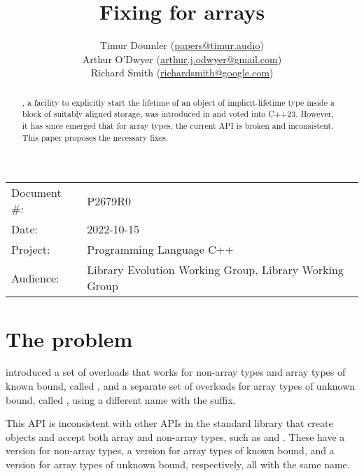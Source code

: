 

\newcommand{\forceindent}{\parindent=1em\indent\parindent=0pt\relax} %


\title{Fixing  for arrays}
\author{
  Timur Doumler \small(\href{mailto:papers@timur.audio}{papers@timur.audio}) \\
  Arthur O'Dwyer \small(\href{mailto:arthur.j.odwyer@gmail.com}{arthur.j.odwyer@gmail.com}) \\
  Richard Smith \small(\href{mailto:richardsmith@google.com}{richardsmith@google.com})
}
\date{}
\maketitle

\begin{tabular}{ll}
Document \#: & P2679R0 \\
Date: & 2022-10-15\\
Project: & Programming Language C++ \\
Audience: & Library Evolution Working Group, Library Working Group
\end{tabular}


\begin{abstract}
, a facility to explicitly start the lifetime of an object of implicit-lifetime type inside a block of suitably aligned storage, was introduced in \cite{P2590R2} and voted into C++23. However, it has since emerged that for array types, the current API is broken and inconsistent. This paper proposes the necessary fixes.
\end{abstract}

\section{The problem}
\label{sec:problem}

\cite{P2590R2} introduced a set of overloads that works for non-array types and array types of known bound, called , and a separate set of overloads for array types of unknown bound, called  , using a different name with the  suffix.

This API is inconsistent with other APIs in the standard library that create objects and accept both array and non-array types, such as  and . These have a version for non-array types, a version for array types of known bound, and a version for array types of unknown bound, respectively, all with the same name.

